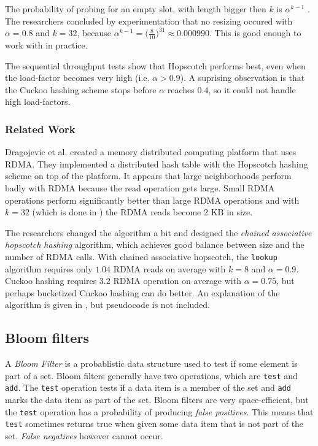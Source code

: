 The probability of probing for an empty slot, with length bigger then $k$ is $\alpha^{k - 1}$ \cite{hopscotch}. The researchers concluded by experimentation that no resizing occured with $\alpha = 0.8$ and $k = 32$, because $\alpha^{k - 1} = \big ( \frac{8}{10} \big )^{31} \approx 0.000990$. This is good enough to work with in practice.

The sequential throughput tests show that Hopscotch performs best, even when the load-factor becomes very high (i.e. $\alpha > 0.9$). A suprising observation is that the Cuckoo hashing scheme stops before $\alpha$ reaches $0.4$, so it could not handle high load-factors. 

\subsubsection{Related Work}
Dragojevic et al. \cite{farm} created a memory distributed computing platform that uses RDMA. They implemented a distributed hash table with the Hopscotch hashing scheme on top of the platform. It appears that large neighborhoods perform badly with RDMA because the read operation gets large. Small RDMA operations perform significantly better than large RDMA operations and with $k = 32$ (which is done in \cite{hopscotch}) the RDMA reads become 2 KB in size. 

The researchers changed the algorithm a bit and designed the \emph{chained associative hopscotch hashing} algorithm, which achieves good balance between size and the number of RDMA calls. With chained associative hopscotch, the \texttt{lookup} algorithm requires only $1.04$ RDMA reads on average with $k = 8$ and $\alpha = 0.9$. Cuckoo hashing requires $3.2$ RDMA operation on average with $\alpha = 0.75$, but perhaps bucketized Cuckoo hashing can do better. An explanation of the algorithm is given in \cite{farm}, but pseudocode is not included.

\subsection{Bloom filters}
A \emph{Bloom Filter} \cite{dharmapurikar2003longest} is a probablistic data structure used to test if some element is part of a set. Bloom filters generally have two operations, which are \texttt{test} and \texttt{add}. The \texttt{test} operation tests if a data item is a member of the set and \texttt{add} marks the data item as part of the set. Bloom filters are very space-efficient, but the \texttt{test} operation has a probability of producing \emph{false positives}. This means that \texttt{test} sometimes returns true when given some data item that is not part of the set. \emph{False negatives} however cannot occur. 


